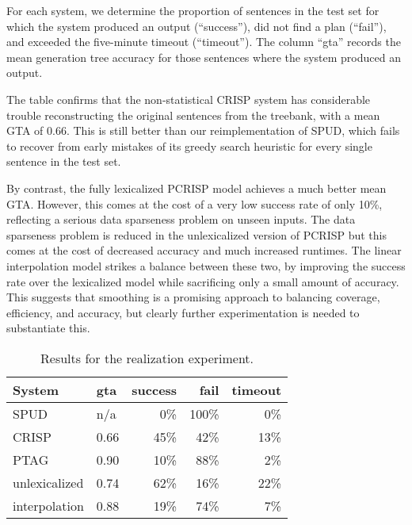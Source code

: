For each system, we determine the proportion of sentences in the test set for which the system produced an output (``success''), did not find a plan (``fail''), and exceeded the five-minute timeout (``timeout'').  The column ``gta'' records the mean generation tree accuracy for those sentences where the system produced an output.

The table confirms that the non-statistical CRISP system has considerable trouble reconstructing the original sentences from the treebank, with a mean GTA of 0.66.  This is still better than our reimplementation of SPUD, which fails to recover from early mistakes of its greedy search heuristic for every single sentence in the test set.

By contrast, the fully lexicalized PCRISP model achieves a much better mean GTA.  However, this comes at the cost of a very low success rate of only 10\%, reflecting a serious data sparseness problem on unseen inputs.  The data sparseness problem is reduced in the unlexicalized version of PCRISP but this comes at the cost of decreased accuracy and much increased runtimes.  The linear interpolation model strikes a balance between these two, by improving the success rate over the lexicalized model while sacrificing only a small amount of accuracy.  This suggests that smoothing is a promising approach to balancing coverage, efficiency, and accuracy, but clearly further experimentation is needed to substantiate this.

\begin{table}
    \begin{center}
    \begin{tabular}{|l||l||r|r|r|}
    \hline
     {\bf System }  & {\bf gta}& {\bf success} & {\bf fail} & {\bf timeout} \\ \hline 
     SPUD         & n/a & 0\% & 100\% & 0\%  \\ \hline 
     CRISP         &  0.66 & 45\% & 42\% & 13\% \\ \hline
     PTAG &  0.90 &  10\% &88\% & 2\% \\ \hline
     unlexicalized & 0.74 & 62\% & 16\% & 22\%\\ \hline
     interpolation & 0.88 & 19\% & 74\% & 7\% \\ \hline
    \end{tabular}
    \end{center}
    \caption{\label{results} Results for the realization experiment.} 
\end{table}



